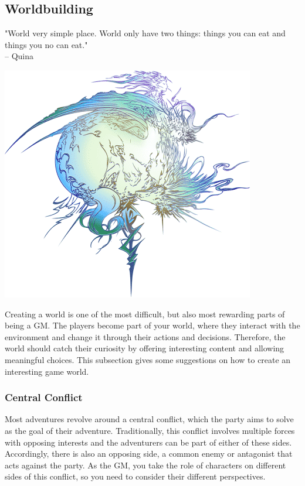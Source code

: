 \subsection*{\hypertarget{world}{Worldbuilding}}
%
"World very simple place. World only have two things: things you can eat and things you no can eat."\\
\indent -- Quina

\begin{center} \includegraphics[width=1\columnwidth]{./art/images/ff13.png} \end{center}
\noindent
Creating a world is one of the most difficult, but also most rewarding parts of being a GM.
The players become part of your world, where they interact with the environment and change it through their actions and decisions. 
Therefore, the world should catch their curiosity by offering interesting content and allowing meaningful choices.
This subsection gives some suggestions on how to create an interesting game world.

\subsubsection*{Central Conflict}
Most adventures revolve around a central conflict, which the party aims to solve as the goal of their adventure.
Traditionally, this conflict involves multiple forces with opposing interests and the adventurers can be part of either of these sides.
Accordingly, there is also an opposing side, a common enemy or antagonist that acts against the party.
As the GM, you take the role of characters on different sides of this conflict, so you need to consider their different perspectives. 

